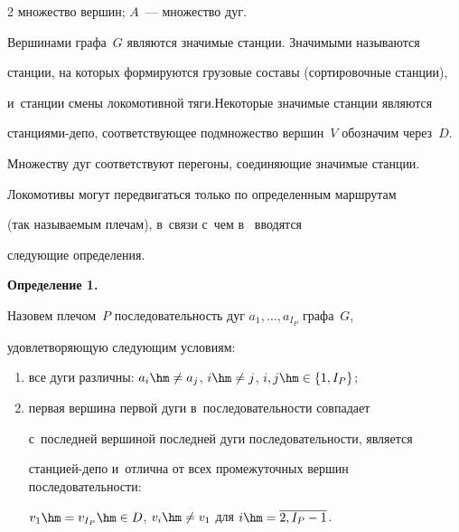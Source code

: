 \begin{multicols}{2}
множество вершин; $A$~--- множество дуг.


Вершинами графа~$G$ являются значимые станции. Значимыми называются 


станции, на которых формируются грузовые составы (сортировочные станции), 


и~станции смены локомотивной тяги.\linebreak Некото\-рые значимые станции являются 


стан\-ци\-ями-де\-по, соответствующее подмножество вершин~$V$ обозначим через~$D$. 


Множеству дуг соответствуют перегоны, соединяющие значимые станции.





Локомотивы могут передвигаться только по определенным маршрутам 


(так называемым плечам), в~связи с~чем в~\cite{AzanovBuyanov} вводятся 


следующие определения.





\smallskip





\noindent


\textbf{Определение 1.}\


    Назовем плечом~$P$ последовательность дуг $a_1,\ldots, a_{I_P}$ графа~$G$, 


     удовлетворяющую следующим условиям:


    \begin{enumerate}[(1)]





    \item


        все дуги различны: $a_i \hm\ne a_j$, $i \hm\ne j$, $i,j \hm\in \{1, I_P\}$;





    \item


        первая вершина первой дуги в~последовательности совпадает 


        с~последней вершиной последней дуги последовательности, является 


        стан\-ци\-ей-де\-по и~отлична от всех промежуточных вершин последовательности: 


        $v_1\hm = v_{I_P}\hm\in D$, $ v_i \hm\ne v_1$ для $i\hm=\overline{2, I_P-1}$.



\end{enumerate}
\end{multicols}
